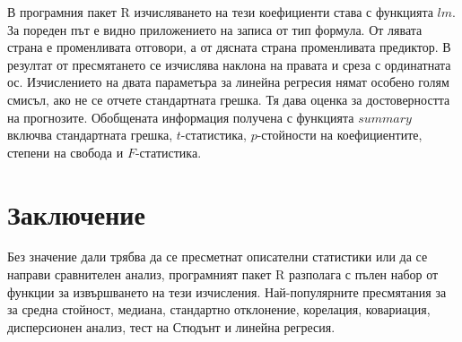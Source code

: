 В програмния пакет R изчисляването на тези коефициенти става с функцията $lm$. За пореден път е видно приложението на записа от тип формула. От лявата страна е променливата отговори, а от дясната страна променливата предиктор. В резултат от пресмятането се изчислява наклона на правата и среза с ординатната ос. Изчислението на двата параметъра за линейна регресия нямат особено голям смисъл, ако не се отчете стандартната грешка. Тя дава оценка за достоверността на прогнозите. Обобщената информация получена с функцията $summary$ включва стандартната грешка, $t$-статистика, $p$-стойности на коефициентите, степени на свобода и $F$-статистика.

\section*{Заключение}

Без значение дали трябва да се пресметнат описателни статистики или да се направи сравнителен анализ, програмният пакет R разполага с пълен набор от функции за извършването на тези изчисления. Най-популярните пресмятания за за средна стойност, медиана, стандартно отклонение, корелация, ковариация, дисперсионен анализ, тест на Стюдънт и линейна регресия. 

